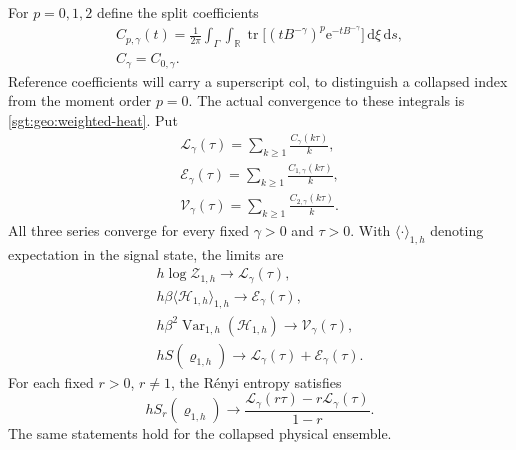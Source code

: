 \documentclass[aps,pra,reprint,superscriptaddress,longbibliography]{revtex4-2}
\newcommand{\dd}{\mathrm d}
\newcommand{\ee}{\mathrm e}
\begin{document}
For $p=0,1,2$ define the split coefficients
\begin{equation}
\begin{gathered}
 C_{p,\gamma}(t)=\frac1{2\pi}
  \int_\Gamma\int_{\mathbb R}
   \operatorname{tr}\bigl[(tB^{-\gamma})^p
                              \ee^{-tB^{-\gamma}}\bigr]
                             \,\dd\xi\,\dd s,
 \\
 C_\gamma=C_{0,\gamma}.
 \label{sgt:bose:weighted-coefficients}
\end{gathered}
\end{equation}
Reference coefficients will carry a superscript $\mathrm{col}$, to
distinguish a collapsed index from the moment order $p=0$.
The actual convergence to these integrals is
\eqref{sgt:geo:weighted-heat}.  Put
\begin{equation}
\begin{gathered}
 \mathcal L_\gamma(\tau)=\sum_{k\ge1}\frac{C_\gamma(k\tau)}k,
 \\
 \mathcal E_\gamma(\tau)=\sum_{k\ge1}\frac{C_{1,\gamma}(k\tau)}k,
 \\
 \mathcal V_\gamma(\tau)=\sum_{k\ge1}\frac{C_{2,\gamma}(k\tau)}k.
 \label{sgt:bose:scalar-coefficients}
\end{gathered}
\end{equation}
All three series converge for every fixed $\gamma>0$ and $\tau>0$.
With $\langle\cdot\rangle_{1,h}$ denoting expectation in the signal
state, the limits are
\begin{gather}
 h\log\mathcal Z_{1,h}\longrightarrow\mathcal L_\gamma(\tau),
 \\
h\beta\langle\mathcal H_{1,h}\rangle_{1,h}
    \longrightarrow\mathcal E_\gamma(\tau),\nonumber\\
 h\beta^2\operatorname{Var}_{1,h}(\mathcal H_{1,h})
    \longrightarrow\mathcal V_\gamma(\tau),
 \\
hS(\varrho_{1,h})
    \longrightarrow\mathcal L_\gamma(\tau)+\mathcal E_\gamma(\tau).
 \label{sgt:bose:scalar-laws}
\end{gather}
For each fixed $r>0$, $r\ne1$, the R\'enyi entropy satisfies
\begin{equation}
 hS_r(\varrho_{1,h})\longrightarrow
 \frac{\mathcal L_\gamma(r\tau)-r\mathcal L_\gamma(\tau)}{1-r}.
 \label{sgt:bose:renyi-law}
\end{equation}
The same statements hold for the collapsed physical ensemble.
\end{document}
